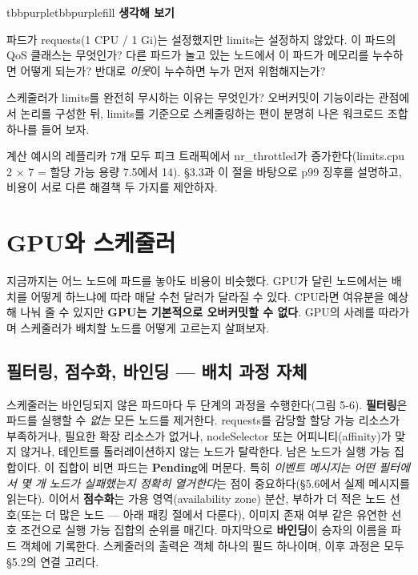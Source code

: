 \begin{calloutbox}{tbbpurple}{tbbpurplefill}
{\normalsize\bfseries\color{tbbpurple}생각해 보기}\par\vspace{3pt}
\begin{tbbitemize}
  \item 파드가 requests(1 CPU / 1 Gi)는 설정했지만 limits는 설정하지 않았다. 이 파드의 QoS 클래스는 무엇인가? 다른 파드가 놀고 있는 노드에서 이 파드가 메모리를 누수하면 어떻게 되는가? 반대로 \textit{이웃}이 누수하면 누가 먼저 위험해지는가?
  \item 스케줄러가 limits를 완전히 무시하는 이유는 무엇인가? 오버커밋이 기능이라는 관점에서 논리를 구성한 뒤, limits를 기준으로 스케줄링하는 편이 분명히 나은 워크로드 조합 하나를 들어 보자.
  \item 계산 예시의 레플리카 7개 모두 피크 트래픽에서 nr\_throttled가 증가한다(limits.cpu 2 × 7 = 할당 가능 용량 7.5에서 14). §3.3과 이 절을 바탕으로 p99 징후를 설명하고, 비용이 서로 다른 해결책 두 가지를 제안하자.
\end{tbbitemize}
\end{calloutbox}

\section{GPU와 스케줄러}

지금까지는 어느 노드에 파드를 놓아도 비용이 비슷했다. GPU가 달린 노드에서는 배치를 어떻게 하느냐에 따라 매달 수천 달러가 달라질 수 있다. CPU라면 여유분을 예상해 나눠 줄 수 있지만 \textbf{GPU는 기본적으로 오버커밋할 수 없다}. GPU의 사례를 따라가며 스케줄러가 배치할 노드를 어떻게 고르는지 살펴보자.

\subsection*{필터링, 점수화, 바인딩 — 배치 과정 자체}

스케줄러는 바인딩되지 않은 파드마다 두 단계의 과정을 수행한다(그림 5-6). \textbf{필터링}은 파드를 실행할 수 \textit{없는} 모든 노드를 제거한다. requests를 감당할 할당 가능 리소스가 부족하거나, 필요한 확장 리소스가 없거나, nodeSelector 또는 어피니티(affinity)가 맞지 않거나, 테인트를 톨러레이션하지 않는 노드가 탈락한다. 남은 노드가 실행 가능 집합이다. 이 집합이 비면 파드는 \textbf{Pending}에 머문다. 특히 \textit{이벤트 메시지는 어떤 필터에서 몇 개 노드가 실패했는지 정확히 열거한다}는 점이 중요하다(§5.6에서 실제 메시지를 읽는다). 이어서 \textbf{점수화}는 가용 영역(availability zone) 분산, 부하가 더 적은 노드 선호(또는 더 많은 노드 — 아래 패킹 절에서 다룬다), 이미지 존재 여부 같은 유연한 선호 조건으로 실행 가능 집합의 순위를 매긴다. 마지막으로 \textbf{바인딩}이 승자의 이름을 파드 객체에 기록한다. 스케줄러의 출력은 객체 하나의 필드 하나이며, 이후 과정은 모두 §5.2의 연결 고리다.

